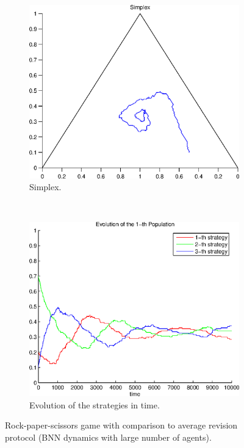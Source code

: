 \begin{figure}
  \centering
  \begin{subfigure}[b]{0.45\textwidth}
	  \includegraphics[width=\textwidth]{./images/test_finite_comparison2average.eps}
	  \caption{Simplex.}
	  \label{fig:finite2_simplex}
  \end{subfigure}
  ~ 
  \begin{subfigure}[b]{0.45\textwidth}
	  \includegraphics[width=\textwidth]{./images/test_finite_comparison2average_ev.eps}
	  \caption{Evolution of the strategies in time.}
	  \label{fig:finite2_ev}
  \end{subfigure}
  \caption{Rock-paper-scissors game with comparison to average revision protocol (BNN dynamics with large number of agents).}
  \label{fig:finite2}
\end{figure}


